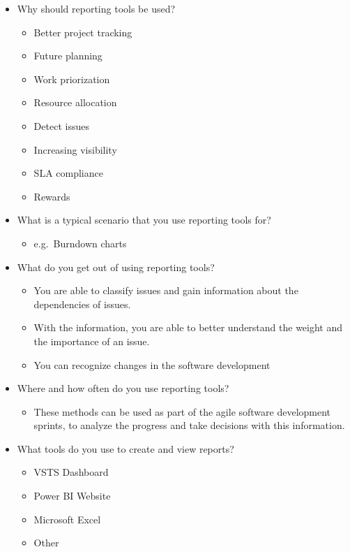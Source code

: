 \begin{itemize}
\tightlist
\item
  Why should reporting tools be used?

  \begin{itemize}
  \tightlist
  \item
    Better project tracking
  \item
    Future planning
  \item
    Work priorization
  \item
    Resource allocation
  \item
    Detect issues
  \item
    Increasing visibility
  \item
    SLA compliance
  \item
    Rewards
  \end{itemize}
\item
  What is a typical scenario that you use reporting tools for?

  \begin{itemize}
  \tightlist
  \item
    e.g.~Burndown charts
  \end{itemize}
\item
  What do you get out of using reporting tools?

  \begin{itemize}
  \tightlist
  \item
    You are able to classify issues and gain information about the
    dependencies of issues.
  \item
    With the information, you are able to better understand the weight
    and the importance of an issue.
  \item
    You can recognize changes in the software development
  \end{itemize}
\item
  Where and how often do you use reporting tools?

  \begin{itemize}
  \tightlist
  \item
    These methods can be used as part of the agile software development
    sprints, to analyze the progress and take decisions with this
    information.
  \end{itemize}
\item
  What tools do you use to create and view reports?

  \begin{itemize}
  \tightlist
  \item
    VSTS Dashboard
  \item
    Power BI Website
  \item
    Microsoft Excel
  \item
    Other
  \end{itemize}
\end{itemize}

